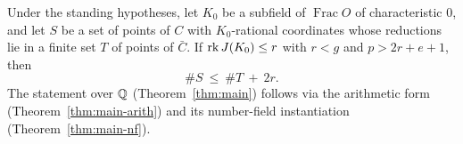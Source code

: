 \begin{theorem}
\label{thm:main-count}
\leanok
Under the standing hypotheses, let $K_0$ be a subfield of $\operatorname{Frac} O$ of
characteristic $0$, and let $S$ be a set of points of $C$ with $K_0$-rational coordinates
whose reductions lie in a finite set $T$ of points of $\bar C$. If
$\operatorname{rk}J(K_0) \le r$ with $r < g$ and $p > 2r + e + 1$, then
\[ \#S\ \le\ \#T\ +\ 2r. \]
The statement over $\mathbb{Q}$ (Theorem~\ref{thm:main}) follows via the arithmetic form
(Theorem~\ref{thm:main-arith}) and its number-field instantiation
(Theorem~\ref{thm:main-nf}).
\end{theorem}
